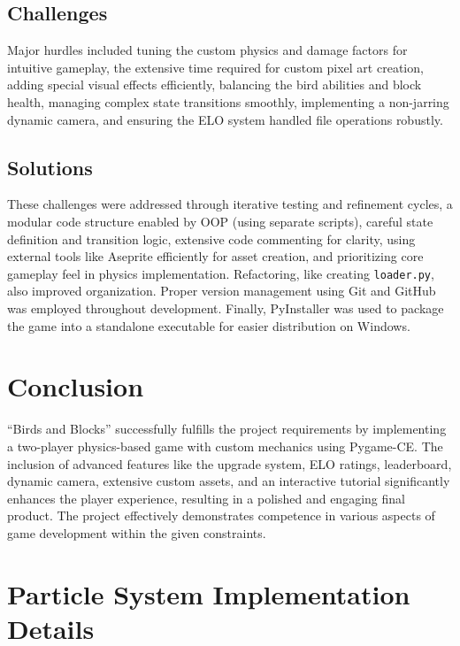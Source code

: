 \documentclass[11pt, a4paper]{article}
\begin{document}
\subsection{Challenges}

Major hurdles included tuning the custom physics and damage factors for intuitive gameplay, the extensive time required for custom pixel art creation, adding special visual effects efficiently, balancing the bird abilities and block health, managing complex state transitions smoothly, implementing a non-jarring dynamic camera, and ensuring the ELO system handled file operations robustly.

\subsection{Solutions}

These challenges were addressed through iterative testing and refinement cycles, a modular code structure enabled by OOP (using separate scripts), careful state definition and transition logic, extensive code commenting for clarity, using external tools like Aseprite efficiently for asset creation, and prioritizing core gameplay feel in physics implementation. Refactoring, like creating \texttt{loader.py}, also improved organization. Proper version management using Git and GitHub was employed throughout development. Finally, PyInstaller was used to package the game into a standalone executable for easier distribution on Windows.


\section{Conclusion}

\enquote{Birds and Blocks} successfully fulfills the project requirements by implementing a two-player physics-based game with custom mechanics using Pygame-CE. The inclusion of advanced features like the upgrade system, ELO ratings, leaderboard, dynamic camera, extensive custom assets, and an interactive tutorial significantly enhances the player experience, resulting in a polished and engaging final product. The project effectively demonstrates competence in various aspects of game development within the given constraints.

\newpage

\appendix

\section{Particle System Implementation Details}
\label{app:particles}
\end{document}
